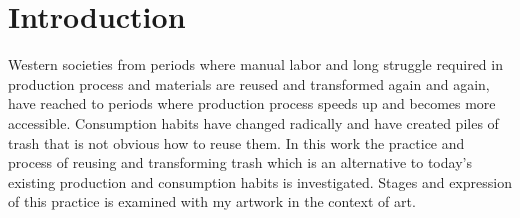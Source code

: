 \chapter{Introduction}


Western societies from periods where manual labor and long struggle required in production process and materials are reused and transformed again and again, have reached to periods where production process speeds up and becomes more accessible. Consumption habits have changed radically and have created piles of trash that is not obvious how to reuse them. In this work the practice and process of reusing and transforming trash which is an alternative to today's existing production and consumption habits is investigated. Stages and expression of this practice is examined with my artwork in the context of art.

% 





